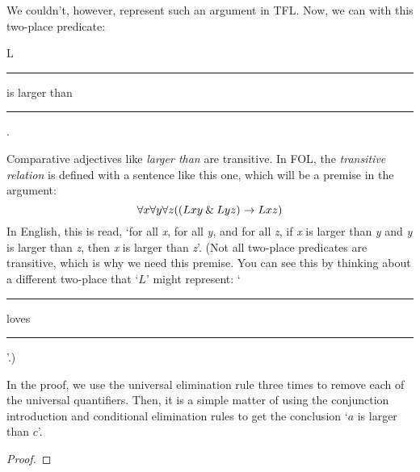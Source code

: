 \noindent We couldn't, however, represent such an argument in TFL. Now, we can with this two-place predicate: 
\begin{ekey}
	\item[L] \rule{1cm}{0.15mm} is larger than \rule{1cm}{0.15mm} .
\end{ekey}
Comparative adjectives like \textit{larger than} are transitive. In FOL, the \textit{transitive relation} is defined with a sentence like this one, which will be a premise in the argument:
$$\forall x \forall y \forall z((Lxy \mathbin{\&} Lyz) \rightarrow Lxz)$$
In English, this is read, `for all \textit{x}, for all \textit{y}, and for all \textit{z}, if \textit{x} is larger than \textit{y} and \textit{y} is larger than \textit{z}, then \textit{x} is larger than \textit{z}'. 
(Not all two-place predicates are transitive, which is why we need this premise. You can see this by thinking about a different two-place that `$L$' might represent: `\rule{1cm}{0.15mm} loves \rule{1cm}{0.15mm}'.)


\smallskip
In the proof, we use the universal elimination rule three times to remove each of the universal quantifiers. Then, it is a simple matter of using the conjunction introduction and conditional elimination rules to get the conclusion `$a$ is larger than $c$'.


\begin{proof}
	 \pr{}
	 \pr{}
	 \pr{}
	 
	 
	 
	 
	 
\end{proof}


